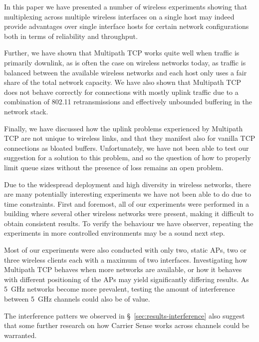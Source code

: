In this paper we have presented a number of wireless experiments showing that
multiplexing across multiple wireless interfaces on a single host may indeed
provide advantages over single interface hosts for certain network
configurations both in terms of reliability and throughput.

Further, we have shown that Multipath TCP works quite well when traffic is
primarily downlink, as is often the case on wireless networks today, as traffic
is balanced between the available wireless networks and each host only uses a
fair share of the total network capacity. We have also shown that Multipath TCP
does not behave correctly for connections with mostly uplink traffic due to a
combination of 802.11 retransmissions and effectively unbounded buffering in the
network stack.

Finally, we have discussed how the uplink problems experienced by Multipath TCP
are not unique to wireless links, and that they manifest also for vanilla TCP
connections as bloated buffers. Unfortunately, we have not been able to test our
suggestion for a solution to this problem, and so the question of how to
properly limit queue sizes without the presence of loss remains an open problem.

Due to the widespread deployment and high diversity in wireless networks, there
are many potentially interesting experiments we have not been able to do due to
time constraints. First and foremost, all of our experiments were performed in
a building where several other wireless networks were present, making it
difficult to obtain consistent results. To verify the behaviour we have
observer, repeating the experiments in more controlled environments may be a
sound next step.

Most of our experiments were also conducted with only two, static APs, two or
three wireless clients each with a maximum of two interfaces. Investigating how
Multipath TCP behaves when more networks are available, or how it behaves with
different positioning of the APs may yield significantly differing results. As
5~GHz networks become more prevalent, testing the amount of interference between
5~GHz channels could also be of value.

The interference patters we observed in \S~\ref{sec:results-interference} also
suggest that some further research on how Carrier Sense works across channels
could be warranted.

